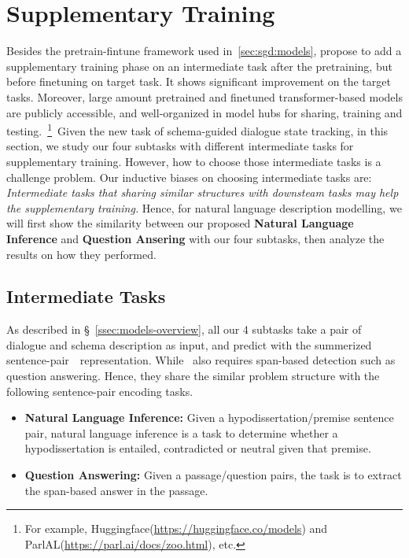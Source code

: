 \section{Supplementary Training}
\label{sec:sgd:sup-training}
Besides the pretrain-fintune framework used in~\autoref{sec:sgd:models},
\citet{phang2018sentence} propose to add a supplementary training
phase on an intermediate task after the pretraining, but before
finetuning on target task. It shows significant improvement on the
target tasks. Moreover, large amount pretrained and finetuned
transformer-based models are publicly accessible, and well-organized
in model hubs for sharing, training and testing.~\footnote{For example,
  Huggingface(\url{https://huggingface.co/models}) and
  ParlAL(\url{https://parl.ai/docs/zoo.html}), etc.}~Given the new
task of schema-guided dialogue state tracking, in this section, we study
our four subtasks with different intermediate tasks for supplementary
training. However, how to choose those intermediate tasks is a
challenge problem. Our inductive biases on choosing intermediate tasks
are: \textit{Intermediate tasks that sharing similar structures with
  downsteam tasks may help the supplementary training.}  Hence, for
natural language description modelling, we will first show the
similarity between our proposed \textbf{Natural Language Inference}
and \textbf{Question Ansering} with our four subtasks, then analyze
the results on how they performed.

\subsection{Intermediate Tasks}
\label{ssec:intermediate-tasks}
As described in \S~\ref{ssec:models-overview}, all our 4
subtasks take a pair of dialogue and schema description as input, and
predict with the summerized sentence-pair~\CLS~representation. While
\NSL~also requires span-based detection such as question
answering. Hence, they share the similar problem structure with the
following sentence-pair encoding tasks.
\begin{itemize}
\item \textbf{Natural Language Inference:} Given a hypodissertation/premise
sentence pair, natural language inference is a task to determine
whether a hypodissertation is entailed, contradicted or neutral given
that premise.

\item \textbf{Question Answering:} Given a passage/question pairs, the
task is to extract the span-based answer in the passage.
\end{itemize}

